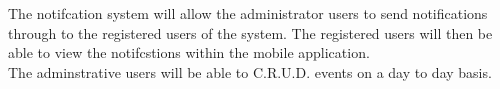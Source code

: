 {
The notifcation system will allow the administrator users to send notifications through to the registered users of the system.
The registered users will then be able to view the notifcstions within the mobile application.\\
The adminstrative users will be able to C.R.U.D. events on a day to day basis.
}
